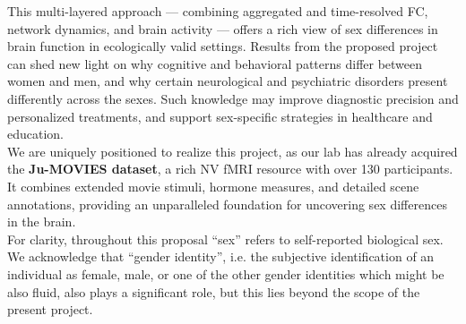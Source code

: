 \documentclass[11pt,a4paper]{article}
\begin{document}
This multi-layered approach — combining aggregated and time-resolved FC, network dynamics, and brain activity — offers 
a rich view of sex differences in brain function in ecologically valid settings. 
Results from the proposed project can shed new light on why cognitive and behavioral patterns differ 
between women and men, and why certain neurological and psychiatric disorders present differently across the sexes. 
Such knowledge may improve diagnostic precision and personalized treatments, and support sex-specific 
strategies in healthcare and education.\\
We are uniquely positioned to realize this project, as our lab has already acquired the \textbf{Ju-MOVIES dataset}, 
a rich NV fMRI resource with over 130 participants. It combines extended movie stimuli, 
hormone measures, and detailed scene annotations, providing an unparalleled foundation for 
uncovering sex differences in the brain.\\
For clarity, throughout this proposal “sex” refers to self-reported biological sex. 
We acknowledge that “gender identity”, i.e. the 
subjective identification of an individual as female, male, or one of the other gender identities which might 
be also fluid, also plays a significant role, but this lies 
beyond the scope of the present project.
\end{document}
